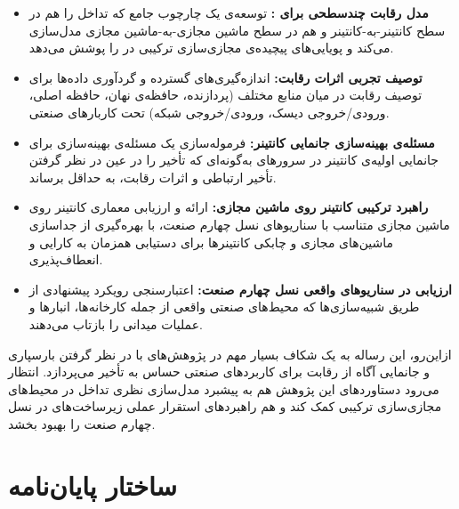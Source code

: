 \begin{itemize}
\item
\textbf{مدل رقابت چندسطحی برای :}
توسعه‌ی یک چارچوب جامع که تداخل را هم در سطح کانتینر-به-کانتینر و هم در سطح ماشین مجازی-به-ماشین مجازی مدل‌سازی می‌کند و پویایی‌های پیچیده‌ی مجازی‌سازی ترکیبی در  را پوشش می‌دهد.

\item
\textbf{توصیف تجربی اثرات رقابت:}
اندازه‌گیری‌های گسترده و گردآوری داده‌ها برای توصیف رقابت در میان منابع مختلف (پردازنده، حافظه‌ی نهان، حافظه اصلی، ورودی/خروجی دیسک، ورودی/خروجی شبکه) تحت کاربارهای صنعتی.

\item
\textbf{مسئله‌ی بهینه‌سازی جانمایی کانتینر:}
فرموله‌سازی یک مسئله‌ی بهینه‌سازی برای جانمایی اولیه‌ی کانتینر در سرورهای  به‌گونه‌ای که تأخیر را در عین در نظر گرفتن تأخیر ارتباطی و اثرات رقابت، به حداقل برساند.

\item
\textbf{راهبرد ترکیبی کانتینر روی ماشین مجازی:}
ارائه و ارزیابی معماری کانتینر روی ماشین مجازی متناسب با سناریوهای نسل چهارم صنعت، با بهره‌گیری از جداسازی ماشین‌های مجازی و چابکی کانتینرها برای دستیابی همزمان به کارایی و انعطاف‌پذیری.

\item
\textbf{ارزیابی در سناریوهای واقعی نسل چهارم صنعت:}
اعتبارسنجی رویکرد پیشنهادی از طریق شبیه‌سازی‌ها که محیط‌های صنعتی واقعی از جمله کارخانه‌ها، انبارها و عملیات میدانی را بازتاب می‌دهند.

\end{itemize}

ازاین‌رو، این رساله به یک شکاف بسیار مهم در پژوهش‌های  با در نظر گرفتن بارسپاری و جانمایی آگاه از رقابت برای کاربردهای صنعتی حساس به تأخیر می‌پردازد. انتظار می‌رود دستاوردهای این پژوهش هم به پیشبرد مدل‌سازی نظری تداخل در محیط‌های مجازی‌سازی ترکیبی کمک کند و هم راهبردهای استقرار عملی زیرساخت‌های  در نسل چهارم صنعت را بهبود بخشد.

\section{ساختار پایان‌نامه}

